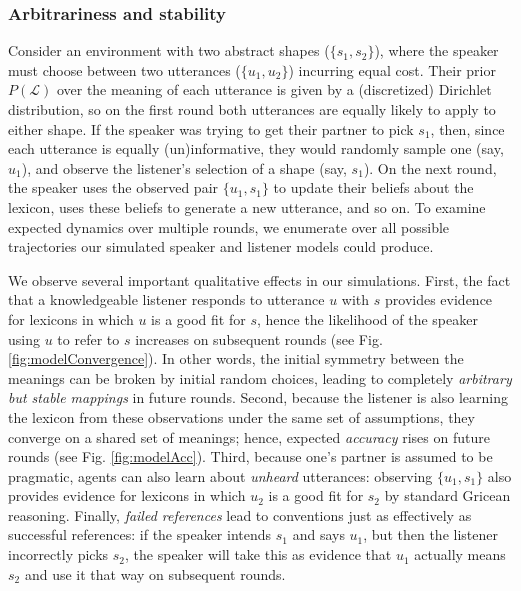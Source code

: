 \documentclass[10pt, letterpaper]{article}
\begin{document}
\subsubsection{Arbitrariness and
stability}\label{arbitrariness-and-stability-1}

Consider an environment with two abstract shapes (\(\{s_1, s_2\}\)),
where the speaker must choose between two utterances (\(\{u_1, u_2\}\))
incurring equal cost. Their prior \(P(\mathcal{L})\) over the meaning of
each utterance is given by a (discretized) Dirichlet distribution, so on
the first round both utterances are equally likely to apply to either
shape. If the speaker was trying to get their partner to pick \(s_1\),
then, since each utterance is equally (un)informative, they would
randomly sample one (say, \(u_1\)), and observe the listener's selection
of a shape (say, \(s_1\)). On the next round, the speaker uses the
observed pair \(\{u_1, s_1\}\) to update their beliefs about the
lexicon, uses these beliefs to generate a new utterance, and so on. To
examine expected dynamics over multiple rounds, we enumerate over all
possible trajectories our simulated speaker and listener models could
produce.

We observe several important qualitative effects in our simulations.
First, the fact that a knowledgeable listener responds to utterance
\(u\) with \(s\) provides evidence for lexicons in which \(u\) is a good
fit for \(s\), hence the likelihood of the speaker using \(u\) to refer
to \(s\) increases on subsequent rounds (see
Fig.\ref{fig:modelConvergence}). In other words, the initial symmetry
between the meanings can be broken by initial random choices, leading to
completely \emph{arbitrary but stable mappings} in future rounds.
Second, because the listener is also learning the lexicon from these
observations under the same set of assumptions, they converge on a
shared set of meanings; hence, expected \emph{accuracy} rises on future
rounds (see Fig. \ref{fig:modelAcc}). Third, because one's partner is
assumed to be pragmatic, agents can also learn about \emph{unheard}
utterances: observing \(\{u_1, s_1\}\) also provides evidence for
lexicons in which \(u_2\) is a good fit for \(s_2\) by standard Gricean
reasoning. Finally, \emph{failed references} lead to conventions just as
effectively as successful references: if the speaker intends \(s_1\) and
says \(u_1\), but then the listener incorrectly picks \(s_2\), the
speaker will take this as evidence that \(u_1\) actually means \(s_2\)
and use it that way on subsequent rounds.
\end{document}
